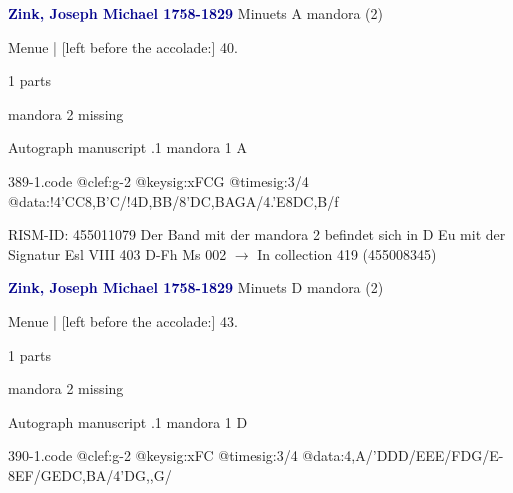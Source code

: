 \documentclass[twocolumn]{book}
\begin{document}
\newline \par \vspace{7pt} \textcolor{darkblue}{\textbf{Zink, Joseph Michael  1758-1829}}
\newline Minuets  A  
\newline mandora (2)
\newline \begin{itshape}[f.23v, at left:] Menue | [left before the accolade:] 40.\end{itshape} 
\newline \textcolor{darkblue}{}  1 parts  
\newline \begin{small} mandora 2 missing\end{small} 
\newline Autograph manuscript
.1  mandora 1  A  
\begin{filecontents*}{389-1.code}
@clef:g-2
@keysig:xFCG
@timesig:3/4
@data:!4'CC{8,B'C}/!4D,BB/{8'DC},BA{GA}/4.'E{8DC,B}/f
\end{filecontents*}
\newline
%

\newline RISM-ID: 455011079
\newline Der Band mit der mandora 2 befindet sich in D Eu mit der Signatur Esl VIII 403
\newline D-Fh  Ms 002
\newline $\rightarrow$ In collection 419 (455008345)

\newline \par \vspace{7pt} \textcolor{darkblue}{\textbf{Zink, Joseph Michael  1758-1829}}
\newline Minuets  D  
\newline mandora (2)
\newline \begin{itshape}[f.25r, at left:] Menue | [left before the accolade:] 43.\end{itshape} 
\newline \textcolor{darkblue}{}  1 parts  
\newline \begin{small} mandora 2 missing\end{small} 
\newline Autograph manuscript
.1  mandora 1  D  
\begin{filecontents*}{390-1.code}
@clef:g-2
@keysig:xFC
@timesig:3/4
@data:4,A/'DDD/EEE/FDG/E-{8EF}/{GE}{DC}{,BA}/4'DG,,G/
\end{filecontents*}
\newline
%
\end{document}
